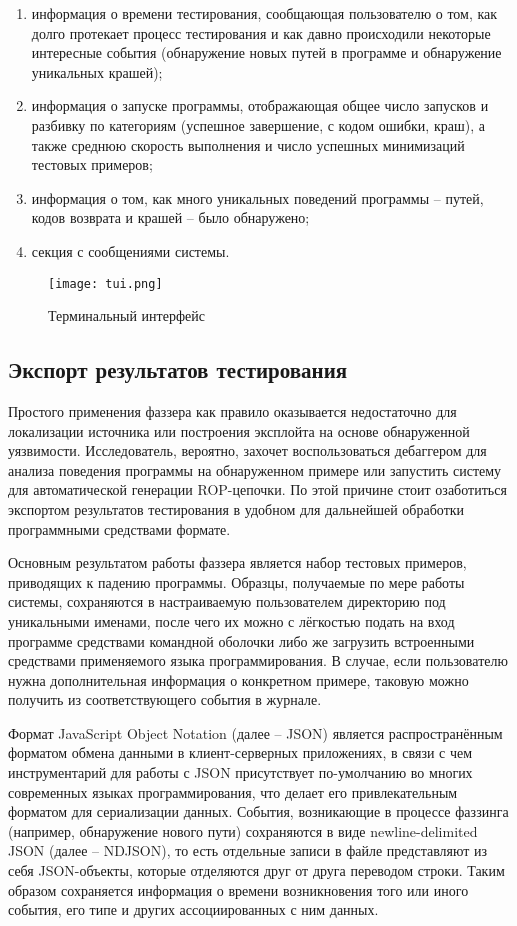 \begin{enumerate}
	\item информация о времени тестирования, сообщающая пользователю о том, как долго протекает процесс тестирования и как давно происходили некоторые интересные события (обнаружение новых путей в программе и обнаружение уникальных крашей);
	
	\item информация о запуске программы, отображающая общее число запусков и разбивку по категориям (успешное завершение, с кодом ошибки, краш), а также среднюю скорость выполнения и число успешных минимизаций тестовых примеров;
	
	\item информация о том, как много уникальных поведений программы -- путей, кодов возврата и крашей -- было обнаружено;
	
	\item секция с сообщениями системы.
\end{enumerate}

\begin{figure}[h]
	\centering
	\texttt{[image: tui.png]}
	\caption{Терминальный интерфейс}
	\label{fig:tui}
\end{figure}%

\subsection{Экспорт результатов тестирования}

Простого применения фаззера как правило оказывается недостаточно для локализации источника или построения эксплойта на основе обнаруженной уязвимости. Исследователь, вероятно, захочет воспользоваться дебаггером для анализа поведения программы на обнаруженном примере или запустить систему для автоматической генерации ROP-цепочки. По этой причине стоит озаботиться экспортом результатов тестирования в удобном для дальнейшей обработки программными средствами формате.

Основным результатом работы фаззера является набор тестовых примеров, приводящих к падению программы. Образцы, получаемые по мере работы системы, сохраняются в настраиваемую пользователем директорию под уникальными именами, после чего их можно с лёгкостью подать на вход программе средствами командной оболочки либо же загрузить встроенными средствами применяемого языка программирования. В случае, если пользователю нужна дополнительная информация о конкретном примере, таковую можно получить из соответствующего события в журнале.

Формат JavaScript Object Notation (далее -- JSON) является распространённым форматом обмена данными в клиент-серверных приложениях, в связи с чем инструментарий для работы с JSON присутствует по-умолчанию во многих современных языках программирования, что делает его привлекательным форматом для сериализации данных. События, возникающие в процессе фаззинга (например, обнаружение нового пути) сохраняются в виде newline-delimited JSON (далее -- NDJSON), то есть отдельные записи в файле представляют из себя JSON-объекты, которые отделяются друг от друга переводом строки. Таким образом сохраняется информация о времени возникновения того или иного события, его типе и других ассоциированных с ним данных.